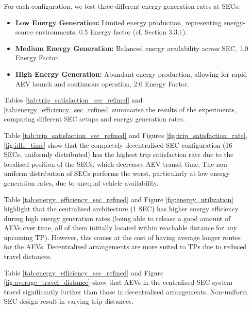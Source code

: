 For each configuration, we test three different energy generation rates at SECs:
\begin{itemize}
    \item \textbf{Low Energy Generation:} Limited energy production, representing energy-scarce environments, 0.5 Energy factor (cf. Section 3.3.1).
    \item \textbf{Medium Energy Generation:} Balanced energy availability across SEC, 1.0 Energy Factor.
    \item \textbf{High Energy Generation:} Abundant energy production, allowing for rapid AEV launch and continuous operation, 2.0 Energy Factor.
\end{itemize}

Tables \ref{tab:trip_satisfaction_sec_refined} and \ref{tab:energy_efficiency_sec_refined} summarise the results of the experiments, comparing different SEC setups and energy generation rates.

Table \ref{tab:trip_satisfaction_sec_refined} and Figures \ref{fig:trip_satisfaction_rate},  \ref{fig:idle_time} show that the completely decentralised SEC configuration (16 SECs, uniformly distributed) has the highest trip satisfaction rate due to the localised position of the SECs, which decreases AEV transit time. The non-uniform distribution of SECs performs the worst, particularly at low energy generation rates, due to unequal vehicle availability.

Table \ref{tab:energy_efficiency_sec_refined} and Figure \ref{fig:energy_utilization} highlight that the centralised architecture (1 SEC) has higher energy efficiency during high energy generation rates (being able to release a good amount of AEVs over time, all of them initially located within reachable distance for any upcoming TP). However, this comes at the cost of having average longer routes for the AEVs. Decentralised arrangements are more suited to TPs due to reduced travel distances.

Table \ref{tab:energy_efficiency_sec_refined} and Figure \ref{fig:average_travel_distance} show that AEVs in the centralised SEC system travel significantly further than those in decentralised arrangements. Non-uniform SEC design result in varying trip distances.

